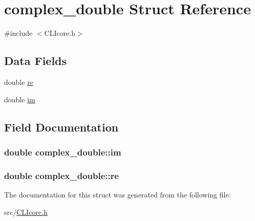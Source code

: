 \hypertarget{structcomplex__double}{}\section{complex\+\_\+double Struct Reference}
\label{structcomplex__double}


{\ttfamily \#include $<$C\+L\+Icore.\+h$>$}

\subsection*{Data Fields}
\begin{DoxyCompactItemize}
\item 
double \hyperlink{structcomplex__double_af3466e0949b17c561569ba827aa878f4}{re}
\item 
double \hyperlink{structcomplex__double_a24c8308c824e9b7256bd1beccb571520}{im}
\end{DoxyCompactItemize}


\subsection{Field Documentation}
\hypertarget{structcomplex__double_a24c8308c824e9b7256bd1beccb571520}{}
\subsubsection[{im}]{\setlength{\rightskip}{0pt plus 5cm}double complex\+\_\+double\+::im}\label{structcomplex__double_a24c8308c824e9b7256bd1beccb571520}
\hypertarget{structcomplex__double_af3466e0949b17c561569ba827aa878f4}{}
\subsubsection[{re}]{\setlength{\rightskip}{0pt plus 5cm}double complex\+\_\+double\+::re}\label{structcomplex__double_af3466e0949b17c561569ba827aa878f4}


The documentation for this struct was generated from the following file\+:\begin{DoxyCompactItemize}
\item 
src/\hyperlink{CLIcore_8h}{C\+L\+Icore.\+h}\end{DoxyCompactItemize}
